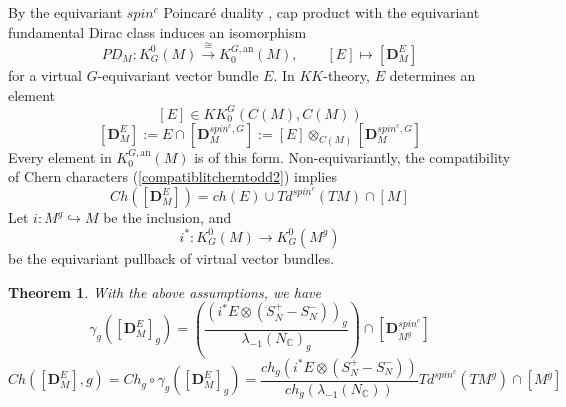 \documentclass[11pt,leqno,twoside]{amsart}
\theoremstyle{plainsl}
\newtheorem{theorem}{Theorem}[section]
\theoremstyle{definition}
\newcommand{\bD}{\mathbf{D}}
\begin{document}
By the equivariant $spin^c$ Poincar\'e duality
\cite[Thm. 3.1 and Remark 3.2(1)]{BOSW}, cap product with the
equivariant fundamental Dirac class induces an isomorphism
\begin{equation}\label{equivariant-$spin^c$-Poincar}
    PD_M:K_G^0(M)\xrightarrow{\cong}K_0^{G,\mathrm{an}}(M),
\qquad
[E]\longmapsto [\bD_M^E]
\end{equation}
for a virtual  $G$-equivariant  vector bundle $E$. 
In $KK$-theory, $E$ determines an element
\[
[E]\in KK^G_0(C(M),C(M))
\]
\[
[\bD_M^E]
:=E\cap[\bD_M^{spin^c,G}]:=
[E]\otimes_{C(M)}[\bD_M^{spin^c,G}]
\]
Every element in $K_0^{G,\mathrm{an}}(M)$ is of this form.
Non-equivariantly, the compatibility of Chern characters (\ref{compatiblitcherntodd2})  implies
\begin{equation}\label{chernofPDspin}
    Ch([\bD_M^E])=ch(E)\cup Td^{spin^c}(TM)\cap [M]
\end{equation}
Let $i:M^g \hookrightarrow M$ be the inclusion, and
\[
i^*:K_G^0(M)\rightarrow K_G^0(M^g)
\]
be the equivariant pullback of virtual vector bundles.
\begin{theorem}\label{smoothlocalanal}
With the above assumptions, we have
\[
\gamma_g([\bD_M^E]_g)
=
\left(
\frac{(i^*E\otimes(S^{+}_N-S^{-}_N))_g}
{\lambda_{-1}(N_{\mathbb{C}})_g}
\right)
\cap [\bD^{spin^c}_{M^g}]
\]
\begin{equation}\label{cherncompelxlocalition}
    Ch([\bD_M^E],g)
=
Ch_g\circ\gamma_g([\bD_M^E]_g)
=
\frac{ch_g(i^*E\otimes(S^{+}_N-S^{-}_N))}
{ch_g(\lambda_{-1}(N_{\mathbb{C}}))}
Td^{spin^c}(TM^g)\cap [M^g]
\end{equation}

\end{theorem}
\end{document}
